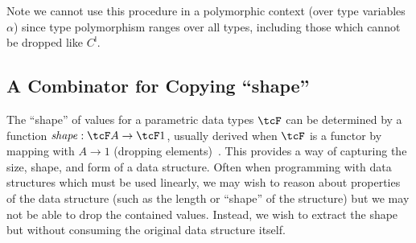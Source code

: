 Note we cannot use this procedure in a polymorphic context (over type
variables $\alpha$) since type polymorphism ranges over all types,
including those which cannot be dropped like $C^{\mathsf{l}}$.


\subsection{A Combinator for Copying ``shape''}

The ``shape'' of values for a parametric data types $\tcF$ can be determined
by a function $\mathit{shape} : \tcF A \rightarrow \tcF 1$, usually
derived when $\tcF$ is a functor by mapping with $A \rightarrow 1$
(dropping elements)~\cite{jay1994shapely}. This provides a way of
capturing the size, shape, and form of a data structure.
Often when programming with data structures which must be
used linearly, we may wish to reason about properties of the data structure
(such as the length or ``shape'' of the structure) but we may not
be able to drop the contained values. Instead, we wish to extract
the shape but without consuming the original data structure itself.

